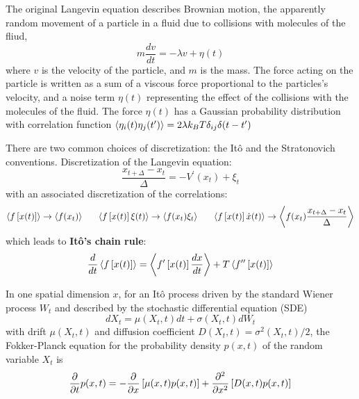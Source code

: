 \documentclass[books,12pt]{elegantpaper}
\begin{document}
The original Langevin equation describes Brownian motion, the apparently random movement of a particle in a fluid due to collisions with molecules of the fliud, 
$$ m \frac{dv}{dt} = - \lambda v + \eta(t) $$
where $v$ is the velocity of the particle, and $m$ is the mass. The force acting on the particle is written as a sum of a viscous force proportional to the particles's velocity, and a noise term $\eta(t)$ representing the effect of the collisions with the molecules of the fluid. The force $\eta(t)$ has a Gaussian probability distribution with correlation function $ \left\langle \eta_i(t) \eta_j(t^\prime) \right\rangle = 2 \lambda k_B T \delta_{ij} \delta(t-t^\prime)$

There are two common choices of discretization: the Itô and the Stratonovich conventions. Discretization of the Langevin equation:
$$ \frac{x_{t+\Delta} - x_t}{\Delta} = -V^\prime(x_t) + \xi_t $$
with an associated discretization of the correlations:
$$ \left\langle f\left[x(t)\right] \right\rangle \to \left\langle f(x_t) \right\rangle \ \ \ \ \  \left\langle f\left[x(t)\right] \xi(t) \right\rangle \to \left\langle f(x_t)\xi_t \right\rangle \ \ \ \ \  \left\langle f\left[x(t)\right] \dot{x}(t) \right\rangle \to \left\langle f(x_t) \frac{x_{t+\Delta} - x_t}{\Delta} \right\rangle $$
which leads to \textbf{Itô's chain rule}:
$$ \frac{d}{dt} \left\langle f\left[x(t)\right] \right\rangle = \left\langle f^\prime\left[x(t)\right] \frac{dx}{dt} \right\rangle + T \left\langle f^{\prime\prime} \left[ x(t) \right] \right\rangle $$


 In one spatial dimension $x$, for an Itô process driven by the standard Wiener process $W_t$ and described by the stochastic differential equation (SDE)
$$ dX_t = \mu(X_t,t) dt + \sigma(X_t,t) dW_t $$
with drift $\mu(X_t,t)$ and diffusion coefficient $D(X_t,t) = \sigma^2(X_t,t)/2$, the Fokker-Planck equation for the probability density $p(x,t)$ of the random variable $X_t$ is
$$ \frac{\partial}{\partial t} p(x,t) = - \frac{\partial}{\partial x} \left[ \mu(x,t) p(x,t) \right] + \pdv[2]{}{x} \left[ D(x,t) p(x,t) \right] $$
\end{document}
